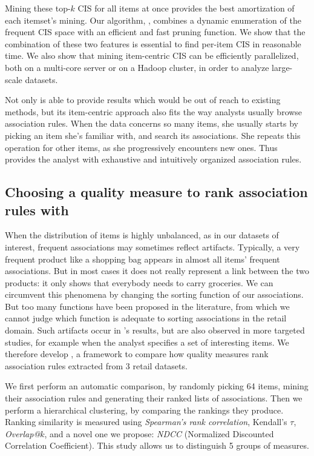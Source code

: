 Mining these top-$k$ CIS for all items at once provides the best amortization of each itemset's mining.
Our algorithm, \toppi, combines a dynamic enumeration of the frequent CIS space
with an efficient and fast pruning function.
We show that the combination of these two features is essential to find
per-item CIS in reasonable time.
We also show that mining item-centric CIS can be efficiently parallelized,
both on a multi-core server or on a Hadoop cluster,
in order to analyze large-scale datasets.

Not only \toppi is able to provide results which would be out of reach to existing methods,
but its item-centric approach also fits the way analysts usually browse association rules.
When the data concerns so many items,
she usually starts by picking an item she's familiar with, and search its associations.
She repeats this operation for other items,
as she progressively encounters new ones.
Thus \toppi provides the analyst with exhaustive and intuitively organized association rules.




\subsection{Choosing a quality measure to rank association rules with \capa}

When the distribution of items is highly unbalanced, as in our datasets of interest,
frequent associations may sometimes reflect artifacts.
Typically, a very frequent product like a shopping bag appears in almost all items' frequent associations.
But in most cases it does not really represent a link between the two products:
it only shows that everybody needs to carry groceries.
We can circumvent this phenomena by changing the sorting function of our associations.
But too many functions have been proposed in the literature,
from which we cannot judge which function is adequate to sorting associations in the retail domain.
Such artifacts occur in \toppi's results, but are also observed in more targeted studies,
for example when the analyst specifies a set of interesting items.
We therefore develop \capa, a framework to compare how \nbm quality measures rank association rules
extracted from 3 retail datasets.

We first perform an automatic comparison, by randomly picking 64 items,
mining their association rules and generating their \nbm ranked lists of associations.
Then we perform a hierarchical clustering, by comparing the rankings they produce.
Ranking similarity is measured using {\em Spearman's rank correlation},
Kendall's $\tau$, {\em Overlap@}$k$, and a novel one we propose: {\em NDCC}
(Normalized Discounted Correlation Coefficient).
This study allows us to distinguish 5 groups of measures.

